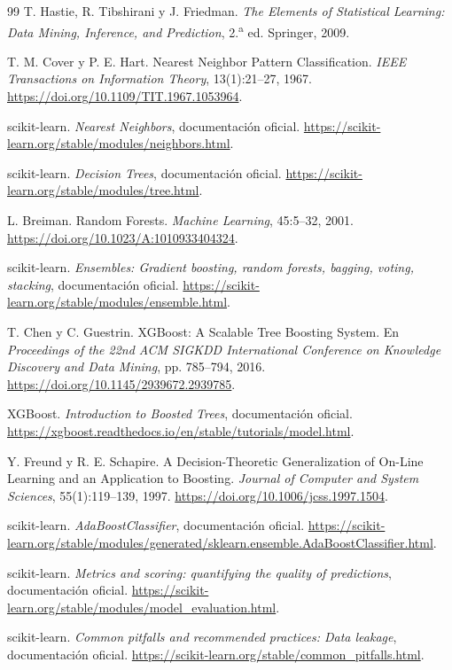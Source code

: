\begin{thebibliography}{99}
T. Hastie, R. Tibshirani y J. Friedman. \emph{The Elements of Statistical Learning:
Data Mining, Inference, and Prediction}, 2.\textsuperscript{a} ed. Springer, 2009.

T. M. Cover y P. E. Hart. Nearest Neighbor Pattern Classification.
\emph{IEEE Transactions on Information Theory}, 13(1):21--27, 1967.
\url{https://doi.org/10.1109/TIT.1967.1053964}.

scikit-learn. \emph{Nearest Neighbors}, documentación oficial.
\url{https://scikit-learn.org/stable/modules/neighbors.html}.

scikit-learn. \emph{Decision Trees}, documentación oficial.
\url{https://scikit-learn.org/stable/modules/tree.html}.

L. Breiman. Random Forests. \emph{Machine Learning}, 45:5--32, 2001.
\url{https://doi.org/10.1023/A:1010933404324}.

scikit-learn. \emph{Ensembles: Gradient boosting, random forests, bagging, voting,
stacking}, documentación oficial.
\url{https://scikit-learn.org/stable/modules/ensemble.html}.

T. Chen y C. Guestrin. XGBoost: A Scalable Tree Boosting System. En
\emph{Proceedings of the 22nd ACM SIGKDD International Conference on Knowledge
Discovery and Data Mining}, pp. 785--794, 2016.
\url{https://doi.org/10.1145/2939672.2939785}.

XGBoost. \emph{Introduction to Boosted Trees}, documentación oficial.
\url{https://xgboost.readthedocs.io/en/stable/tutorials/model.html}.

Y. Freund y R. E. Schapire. A Decision-Theoretic Generalization of On-Line Learning
and an Application to Boosting. \emph{Journal of Computer and System Sciences},
55(1):119--139, 1997. \url{https://doi.org/10.1006/jcss.1997.1504}.

scikit-learn. \emph{AdaBoostClassifier}, documentación oficial.
\url{https://scikit-learn.org/stable/modules/generated/sklearn.ensemble.AdaBoostClassifier.html}.

scikit-learn. \emph{Metrics and scoring: quantifying the quality of predictions},
documentación oficial.
\url{https://scikit-learn.org/stable/modules/model_evaluation.html}.

scikit-learn. \emph{Common pitfalls and recommended practices: Data leakage},
documentación oficial.
\url{https://scikit-learn.org/stable/common_pitfalls.html}.


\end{thebibliography}
